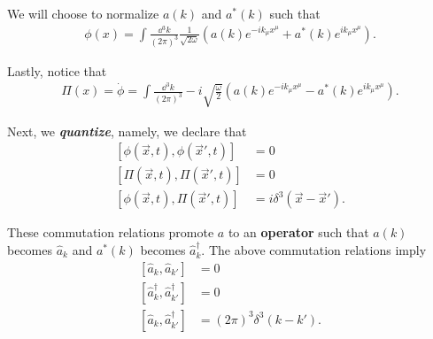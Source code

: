\begin{note}
    We will choose to normalize $a\left( k \right) $ and $a^{*}\left( k \right) $ such that
    \begin{align}
        \phi \left( x \right) = \int \frac{\dd{^3k}}{\left( 2\pi \right)^3} \frac{1}{\sqrt{2 \omega} } \left( a \left( k \right) e^{-i k_\mu x^{\mu}} + a^{*}\left( k \right) e^{i k_\mu x^{\mu}} \right) 
    .\end{align}
\end{note}

Lastly, notice that
\begin{align}
    \Pi \left( x \right) = \dot{\phi} = \int \frac{\dd{^3k}}{\left( 2\pi \right)^3} -i \sqrt{\frac{\omega}{2}} \left( a \left( k \right) e^{-i k_\mu x^{\mu}} - a^{*}\left( k \right) e^{i k_\mu x^{\mu}} \right)  
.\end{align}

Next, we \textit{\textbf{quantize}}, namely, we declare that
\begin{align}
    \left[ \phi \left( \vec{x},t \right) , \phi \left( \vec{x}',t \right)  \right] &= 0 \\
    \left[ \Pi \left( \vec{x},t \right) , \Pi \left( \vec{x}',t \right)  \right] &= 0 \\
    \left[ \phi \left( \vec{x},t \right) , \Pi \left( \vec{x}', t \right)  \right] &= i \delta^{3} \left( \vec{x} - \vec{x}' \right) 
.\end{align}

\begin{claim}
    These commutation relations promote $a$ to an \textbf{operator} such that $a \left( k \right) $ becomes $\hat{a}_{k}$ and $a^{*} \left( k \right)$ becomes $\hat{a}_{k}^{\dag}$. The above commutation relations imply
\begin{align}
    \left[ \hat{a}_k, \hat{a}_{k'} \right] &= 0 \\ 
    \left[ \hat{a}_k^{\dag}, \hat{a}^{\dag}_{k'} \right] &= 0 \\
    \left[ \hat{a}_k, \hat{a}_{k'}^{\dag} \right] &= \left( 2\pi \right)^3 \delta^{3} \left( k - k' \right) 
.\end{align}
\end{claim}

